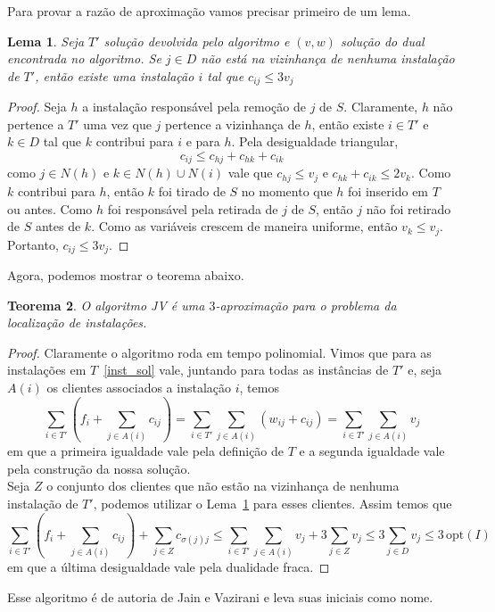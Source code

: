 \documentclass[12pt]{article}
\newcommand{\opt}{\ensuremath{\mathrm{opt}}}
\newtheorem{theorem}{Teorema}[section]
\newtheorem{lemma}[theorem]{Lema}
\begin{document}
Para provar a razão de aproximação vamos precisar primeiro de um lema.
\begin{lemma}
    \label{lemma:3.9}
    Seja $T'$ solução devolvida pelo algoritmo e $(v,w)$ solução do dual encontrada no algoritmo. Se $j \in D$ não está na vizinhança de nenhuma instalação de $T'$, então existe uma instalação $i$ tal que $c_{ij} \leq 3v_j$
\end{lemma}
\begin{proof}
    Seja $h$ a instalação responsável pela remoção de $j$ de $S$. Claramente, $h$ não pertence a $T'$ uma vez que $j$ pertence a vizinhança de $h$, então existe $i \in T'$ e $k \in D$ tal que $k$ contribui para $i$ e para $h$. Pela desigualdade triangular,
    \[c_{ij} \leq c_{hj} + c_{hk} + c_{ik}\]
    como $j \in N(h)$ e $k \in N(h) \cup N(i)$ vale que $c_{hj} \leq v_j$ e $c_{hk} + c_{ik} \leq 2v_k$. Como $k$ contribui para $h$, então $k$ foi tirado de $S$ no momento que $h$ foi inserido em $T$ ou antes. Como $h$ foi responsável pela retirada de $j$ de $S$, então $j$ não foi retirado de $S$ antes de $k$. Como as variáveis crescem de maneira uniforme, então $v_k \leq v_j$.\\
    Portanto, $c_{ij}\leq 3v_j$. 
\end{proof}

Agora, podemos mostrar o teorema abaixo.
\begin{theorem}
    O algoritmo {\sc JV} é uma $3$-aproximação para o problema da localização de instalações.
\end{theorem}
\begin{proof}
    Claramente o algoritmo roda em tempo polinomial. Vimos que para as instalações em $T$~\ref{inst_sol} vale, juntando para todas as instâncias de $T'$ e, seja $A(i)$ os clientes associados a instalação $i$, temos
    \[\sum_{i \in T'} (f_i + \sum_{j \in A(i)} c_{ij}) = \sum_{i \in T'} \sum_{j \in A(i)} (w_{ij} + c_{ij}) = \sum_{i \in T'} \sum_{j \in A(i)} v_j\]
    em que a primeira igualdade vale pela definição de $T$ e a segunda igualdade vale pela construção da nossa solução. \\
    Seja $Z$ o conjunto dos clientes que não estão na vizinhança de nenhuma instalação de $T'$, podemos utilizar o Lema~\ref{lemma:3.9} para esses clientes. Assim temos que
    \[\sum_{i \in T'} (f_i + \sum_{j \in A(i)} c_{ij}) + \sum_{j \in Z} c_{\sigma(j)j}\leq \sum_{i \in T'} \sum_{j \in A(i)} v_j + 3 \sum_{j \in Z} v_j \leq 3 \sum_{j \in D} v_j\leq 3\,\opt(I)\]
    em que a última desigualdade vale pela dualidade fraca.
\end{proof}
Esse algoritmo é de autoria de Jain e Vazirani e leva suas iniciais como nome.
\newpage
\end{document}
